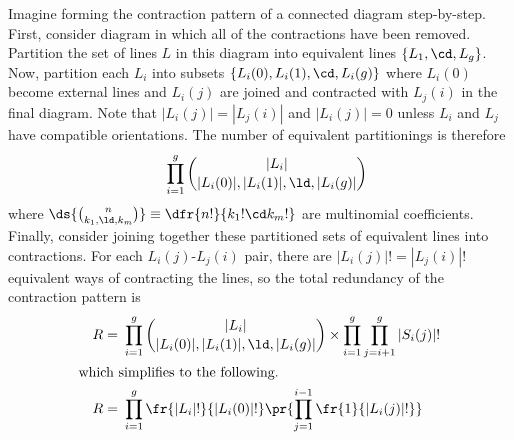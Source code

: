 \documentclass[11pt,fleqn]{article}
\numberwithin{equation}{section}
\begin{document}
\begin{drv}
Imagine forming the contraction pattern of a connected diagram step-by-step.
First, consider diagram in which all of the contractions have been removed.
Partition the set of lines $L$ in this diagram into equivalent lines $\{L_1,\cd,L_g\}$.
Now, partition each $L_i$ into subsets $\{L_i(0),L_i(1),\cd,L_i(g)\}$ where $L_i(0)$ become external lines and $L_i(j)$ are joined and contracted with $L_j(i)$ in the final diagram.
Note that $|L_i(j)|=|L_j(i)|$ and $|L_i(j)|=0$ unless $L_i$ and $L_j$ have compatible orientations.
The number of equivalent partitionings is therefore
\begin{align*}
&&
  \prod_{i=1}^g
  {|L_i| \choose |L_i(0)|, |L_i(1)|, \ld, |L_i(g)|}
\end{align*}
where $\ds{{n \choose k_1,\ld,k_m}}\equiv\dfr{n!}{k_1!\cd k_m!}$ are multinomial coefficients.
Finally, consider joining together these partitioned sets of equivalent lines into contractions.
For each $L_i(j)$-$L_j(i)$ pair, there are $|L_i(j)|!=|L_j(i)|!$ equivalent ways of contracting the lines, so the total redundancy of the contraction pattern is
\begin{align}
&&\nonumber
  R
=&\
  \prod_{i=1}^g
  {|L_i| \choose |L_i(0)|, |L_i(1)|, \ld, |L_i(g)|}
  \times
  \prod_{i=1}^g
  \prod_{j=i+1}^g
  |S_i(j)|!
\\\intertext{which simplifies to the following.}
&&
  R
=&\
  \prod_{i=1}^g
  \fr{|L_i|!}{|L_i(0)|!}
  \pr{
    \prod_{j=1}^{i-1}
    \fr{1}{|L_i(j)|!}
  }
\end{align}
\end{drv}

\end{document}
